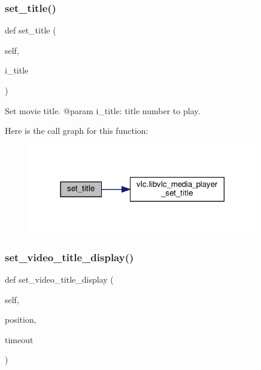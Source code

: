 \subsubsection{\texorpdfstring{set\+\_\+title()}{set\_title()}}
{\footnotesize\ttfamily def set\+\_\+title (\begin{DoxyParamCaption}\item[{}]{self,  }\item[{}]{i\+\_\+title }\end{DoxyParamCaption})}

\begin{DoxyVerb}Set movie title.
@param i_title: title number to play.
\end{DoxyVerb}
 Here is the call graph for this function\+:
\nopagebreak
\begin{figure}[H]
\begin{center}
\leavevmode
\includegraphics[width=285pt]{classvlc_1_1_media_player_a21cfaebe83eae792ac9898aa5c40045f_cgraph}
\end{center}
\end{figure}
\mbox{\label{classvlc_1_1_media_player_afb770de67353fac470a84cb5e15366fa}} 
\subsubsection{\texorpdfstring{set\+\_\+video\+\_\+title\+\_\+display()}{set\_video\_title\_display()}}
{\footnotesize\ttfamily def set\+\_\+video\+\_\+title\+\_\+display (\begin{DoxyParamCaption}\item[{}]{self,  }\item[{}]{position,  }\item[{}]{timeout }\end{DoxyParamCaption})}

